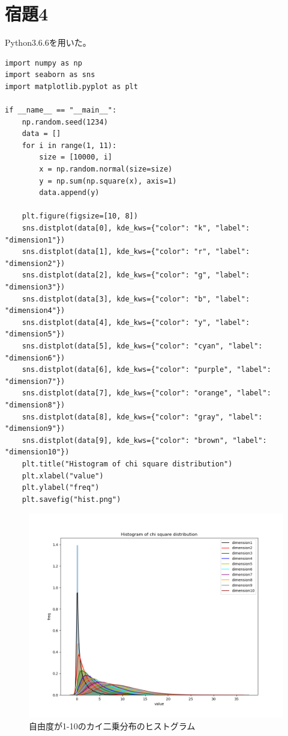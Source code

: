 \documentclass[10pt,a4paper]{ltjsarticle}       %
\begin{document}
\section{宿題4}
Python3.6.6を用いた。
\begin{lstlisting}
import numpy as np
import seaborn as sns
import matplotlib.pyplot as plt

if __name__ == "__main__":
    np.random.seed(1234)
    data = []
    for i in range(1, 11):
        size = [10000, i]
        x = np.random.normal(size=size)
        y = np.sum(np.square(x), axis=1)
        data.append(y)

    plt.figure(figsize=[10, 8])
    sns.distplot(data[0], kde_kws={"color": "k", "label": "dimension1"})
    sns.distplot(data[1], kde_kws={"color": "r", "label": "dimension2"})
    sns.distplot(data[2], kde_kws={"color": "g", "label": "dimension3"})
    sns.distplot(data[3], kde_kws={"color": "b", "label": "dimension4"})
    sns.distplot(data[4], kde_kws={"color": "y", "label": "dimension5"})
    sns.distplot(data[5], kde_kws={"color": "cyan", "label": "dimension6"})
    sns.distplot(data[6], kde_kws={"color": "purple", "label": "dimension7"})
    sns.distplot(data[7], kde_kws={"color": "orange", "label": "dimension8"})
    sns.distplot(data[8], kde_kws={"color": "gray", "label": "dimension9"})
    sns.distplot(data[9], kde_kws={"color": "brown", "label": "dimension10"})
    plt.title("Histogram of chi square distribution")
    plt.xlabel("value")
    plt.ylabel("freq")
    plt.savefig("hist.png")
\end{lstlisting}
\clearpage
\begin{figure}
  \begin{center}
    \includegraphics[clip, scale=0.6]{hist.png}
    \caption{自由度が1-10のカイ二乗分布のヒストグラム}
  \end{center}
\end{figure}
\end{document}
